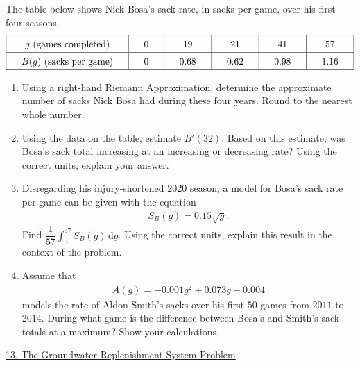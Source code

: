 The table below shows Nick Bosa's sack rate, in sacks per game, over his first four seasons. \begin{align*}
    \arraycolsep=16.5pt\def\arraystretch{1.5}
    \begin{array}{|c|c|c|c|c|c|}
        \hline
        g \text{ (games completed)} & 0 & 19 & 21 & 41 & 57 \\ \hline
        B(g) \text{ (sacks per game)} & 0 & 0.68 & 0.62 & 0.98 & 1.16 \\
        \hline
    \end{array}
\end{align*}
\begin{enumerate}[label=\hspace{11pt}(\alph*), align=left, leftmargin=*, labelsep=0.25em]
    \item Using a right-hand Riemann Approximation, determine the approximate number of sacks Nick Bosa had during these four years. Round to the nearest whole number. 
    \item Using the data on the table, estimate $B'(32)$. Based on this estimate, was Bosa's sack total increasing at an increasing or decreasing rate? Using the correct units, explain your answer.
    \item Disregarding his injury-shortened 2020 season, a model for Bosa's sack rate per game can be given with the equation \begin{align*}
        S_B(g) = 0.15\sqrt{g}.
    \end{align*}
    Find $\dfrac{1}{57}\int_0^{57} S_B(g) \,\mathrm{d}g$. Using the correct units, explain this result in the context of the problem.
    \item Assume that \begin{align*}
        A(g) = -0.001g^2 + 0.073g - 0.004
    \end{align*}
    models the rate of Aldon Smith's sacks over his first $50$ games from $2011$ to $2014$. During what game is the difference between Bosa's and Smith's sack totals at a maximum? Show your calculations.
\end{enumerate} \vspace{11pt}

\begin{center}
    \underline{13. The Groundwater Replenishment System Problem}
\end{center}

